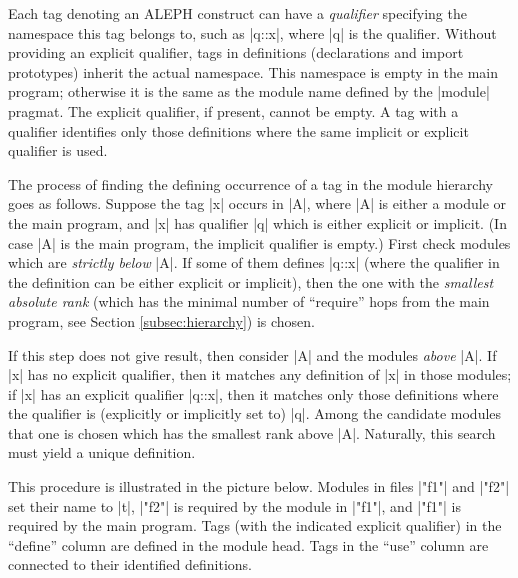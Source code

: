 \documentclass[titlepage]{article}
\newcommand\A{\textsf{ALEPH}}
\def\cc{\kern-0.6pt:\kern-1pt:\kern-0.5pt}
\newcommand\g[1]{\textsf{\color{blue!90!black}#1}}
\begin{document}
Each \g{tag} denoting an \A{} construct can have a \emph{qualifier}
specifying the namespace this tag belongs to, such as \pp|q{\cc}x|,
where \pp|q| is the qualifier. Without providing an explicit qualifier, tags
in definitions (declarations and import prototypes) inherit the actual
namespace. This namespace is empty in the main program; otherwise it is the
same as the module name defined by the \pp|module| pragmat. The explicit
qualifier, if present, cannot be empty. A \g{tag} with a qualifier
identifies only those definitions where the same implicit or explicit
qualifier is used.

The process of finding the defining occurrence of a \g{tag} in the module
hierarchy goes as follows. Suppose the \g{tag} \pp|x| occurs in \pp|A|,
where \pp|A| is either a module or the main program, and \pp|x| has
qualifier \pp|q| which is either explicit or implicit. (In case \pp|A| is
the main program, the implicit qualifier is empty.) First check modules
which are \emph{strictly below} \pp|A|. If some of them defines \pp|q{\cc}x|
(where the qualifier in the definition can be either explicit or implicit),
then the one with the \emph{smallest absolute rank} (which has the minimal
number of ``require'' hops from the main program, see Section
\ref{subsec:hierarchy}) is chosen.

If this step does not give result, then consider \pp|A| and the modules
\emph{above} \pp|A|. If \pp|x| has no explicit qualifier, then it matches
any definition of \pp|x| in those modules; if \pp|x| has an explicit
qualifier \pp|q{\cc}x|, then it matches only those definitions where the
qualifier is (explicitly or implicitly set to) \pp|q|. Among the candidate
modules that one is chosen which has the smallest rank above \pp|A|.
Naturally, this search must yield a unique definition.

This procedure is illustrated in the picture below. Modules in files
\pp|"f1"| and \pp|"f2"| set their name to \pp|t|, \pp|"f2"| is required by
the module in \pp|"f1"|, and \pp|"f1"| is required by the main program. Tags
(with the indicated explicit qualifier) in the ``define'' column are defined in the
module head. Tags in the ``use'' column are connected to their identified
definitions.
\end{document}
